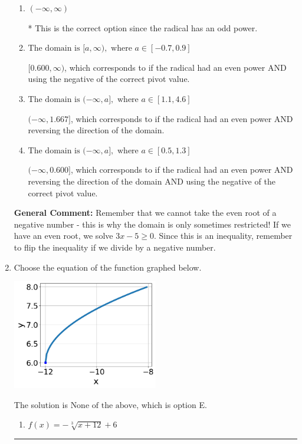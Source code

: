 \documentclass{extbook}[14pt]
\newcommand{\litem}[1]{\item #1

\rule{\textwidth}{0.4pt}}
\begin{document}
\begin{enumerate}
{\begin{enumerate}[label=\Alph*.]
$[1.667, \infty)$, which corresponds to if the radical had an even power.
\item \( (-\infty, \infty) \)

* This is the correct option since the radical has an odd power.
\item \( \text{The domain is } [a, \infty), \text{   where } a \in [-0.7, 0.9] \)

$[0.600, \infty)$, which corresponds to if the radical had an even power AND using the negative of the correct pivot value.
\item \( \text{The domain is } (-\infty, a], \text{   where } a \in [1.1, 4.6] \)

$(-\infty, 1.667]$, which corresponds to if the radical had an even power AND reversing the direction of the domain.
\item \( \text{The domain is } (-\infty, a], \text{   where } a \in [0.5, 1.3] \)

$(-\infty, 0.600]$, which corresponds to if the radical had an even power AND reversing the direction of the domain AND using the negative of the correct pivot value.
\end{enumerate}

\textbf{General Comment:} Remember that we cannot take the even root of a negative number - this is why the domain is only sometimes restricted! If we have an even root, we solve $3 x - 5 \geq 0$. Since this is an inequality, remember to flip the inequality if we divide by a negative number.
}
\litem{
Choose the equation of the function graphed below.

\begin{center}
    \includegraphics[width=0.5\textwidth]{../Figures/radicalGraphToEquationA.png}
\end{center}


The solution is \( \text{None of the above} \), which is option E.\begin{enumerate}[label=\Alph*.]
\item \( f(x) = - \sqrt[3]{x + 12} + 6 \)


\end{enumerate}}
\end{enumerate}
\end{document}
